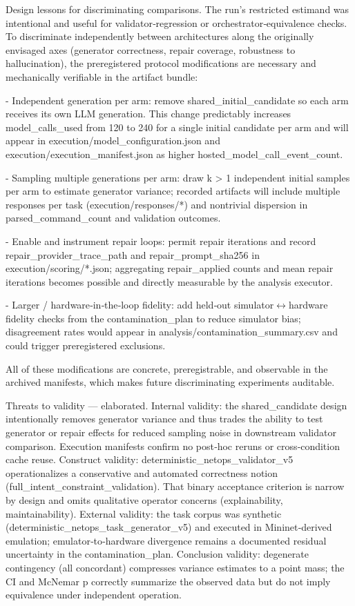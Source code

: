 \documentclass[conference]{IEEEtran}
\begin{document}
Design lessons for discriminating comparisons. The run's restricted estimand was intentional and useful for validator‑regression or orchestrator‑equivalence checks. To discriminate independently between architectures along the originally envisaged axes (generator correctness, repair coverage, robustness to hallucination), the preregistered protocol modifications are necessary and mechanically verifiable in the artifact bundle:

- Independent generation per arm: remove shared\_initial\_candidate so each arm receives its own LLM generation. This change predictably increases model\_calls\_used from 120 to 240 for a single initial candidate per arm and will appear in execution/model\_configuration.json and execution/execution\_manifest.json as higher hosted\_model\_call\_event\_count.

- Sampling multiple generations per arm: draw k > 1 independent initial samples per arm to estimate generator variance; recorded artifacts will include multiple responses per task (execution/responses/*) and nontrivial dispersion in parsed\_command\_count and validation outcomes.

- Enable and instrument repair loops: permit repair iterations and record repair\_provider\_trace\_path and repair\_prompt\_sha256 in execution/scoring/*.json; aggregating repair\_applied counts and mean repair iterations becomes possible and directly measurable by the analysis executor.

- Larger / hardware‑in‑the‑loop fidelity: add held‑out simulator\ensuremath{\leftrightarrow}hardware fidelity checks from the contamination\_plan to reduce simulator bias; disagreement rates would appear in analysis/contamination\_summary.csv and could trigger preregistered exclusions.

All of these modifications are concrete, preregistrable, and observable in the archived manifests, which makes future discriminating experiments auditable.

Threats to validity --- elaborated. Internal validity: the shared\_candidate design intentionally removes generator variance and thus trades the ability to test generator or repair effects for reduced sampling noise in downstream validator comparison. Execution manifests confirm no post‑hoc reruns or cross‑condition cache reuse. Construct validity: deterministic\_netops\_validator\_v5 operationalizes a conservative and automated correctness notion (full\_intent\_constraint\_validation). That binary acceptance criterion is narrow by design and omits qualitative operator concerns (explainability, maintainability). External validity: the task corpus was synthetic (deterministic\_netops\_task\_generator\_v5) and executed in Mininet‑derived emulation; emulator‑to‑hardware divergence remains a documented residual uncertainty in the contamination\_plan. Conclusion validity: degenerate contingency (all concordant) compresses variance estimates to a point mass; the CI and McNemar p correctly summarize the observed data but do not imply equivalence under independent operation.
\end{document}
